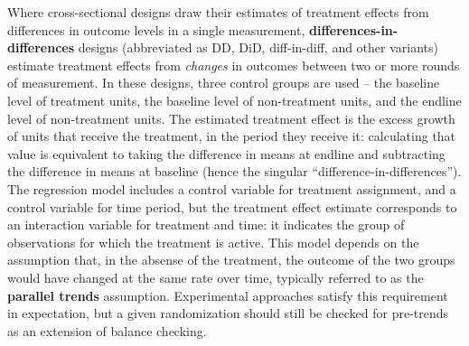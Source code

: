 Where cross-sectional designs draw their estimates of treatment effects
from differences in outcome levels in a single measurement,
\textbf{differences-in-differences}
designs (abbreviated as DD, DiD, diff-in-diff, and other variants)
estimate treatment effects from \textit{changes} in outcomes
between two or more rounds of measurement.
In these designs, three control groups are used –
the baseline level of treatment units,
the baseline level of non-treatment units,
and the endline level of non-treatment units.\cite{torres2015}
The estimated treatment effect is the excess growth
of units that receive the treatment, in the period they receive it:
calculating that value is equivalent to taking
the difference in means at endline and subtracting
the difference in means at baseline
(hence the singular ``difference-in-differences'').\cite{mckenzie2012beyond}
The regression model includes a control variable for treatment assignment,
and a control variable for time period,
but the treatment effect estimate corresponds to
an interaction variable for treatment and time:
it indicates the group of observations for which the treatment is active.
This model depends on the assumption that,
in the absense of the treatment,
the outcome of the two groups would have changed at the same rate over time,
typically referred to as the \textbf{parallel trends} assumption.
Experimental approaches satisfy this requirement in expectation,
but a given randomization should still be checked for pre-trends
as an extension of balance checking.

